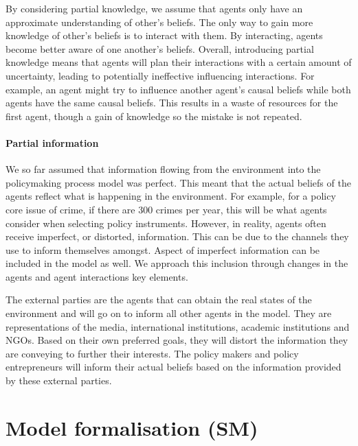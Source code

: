 \documentclass[11pt]{article}
\begin{document}
By considering partial knowledge, we assume that agents only have an approximate understanding of other's beliefs. The only way to gain more knowledge of other's beliefs is to interact with them. By interacting, agents become better aware of one another's beliefs. Overall, introducing partial knowledge means that agents will plan their interactions with a certain amount of uncertainty, leading to potentially ineffective influencing interactions. For example, an agent might try to influence another agent's causal beliefs while both agents have the same causal beliefs. This results in a waste of resources for the first agent, though a gain of knowledge so the mistake is not repeated.

\paragraph{Partial information}

We so far assumed that information flowing from the environment into the policymaking process model was perfect. This meant that the actual beliefs of the agents reflect what is happening in the environment. For example, for a policy core issue of crime, if there are 300 crimes per year, this will be what agents consider when selecting policy instruments. However, in reality, agents often receive imperfect, or distorted, information. This can be due to the channels they use to inform themselves amongst. Aspect of imperfect information can be included in the model as well. We approach this inclusion through changes in the agents and agent interactions key elements.

The external parties are the agents that can obtain the real states of the environment and will go on to inform all other agents in the model. They are representations of the media, international institutions, academic institutions and NGOs. Based on their own preferred goals, they will distort the information they are conveying to further their interests. The policy makers and policy entrepreneurs will inform their actual beliefs based on the information provided by these external parties.



\section{Model formalisation (SM)}
\end{document}
